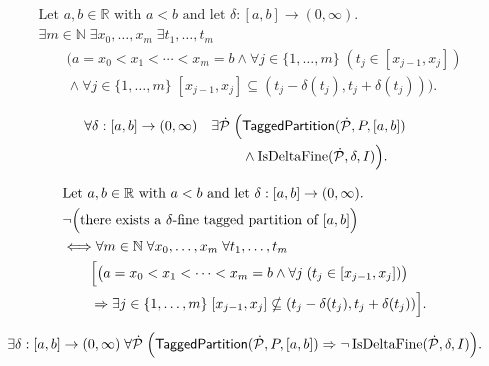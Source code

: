 \begin{remark*}
\[
\begin{aligned}
&\text{Let } a,b \in \mathbb{R} \text{ with } a < b \text{ and let } \delta:[a,b]\to(0,\infty).\\
&\exists m \in \mathbb{N}\;\exists x_0,\ldots,x_m\;\exists t_1,\ldots,t_m\\
&\qquad\bigl(a=x_0<x_1<\cdots<x_m=b
\land \forall j\in\{1,\ldots,m\}\;(t_j\in[x_{j-1},x_j])\\
&\qquad\land
\forall j\in\{1,\ldots,m\}\;[x_{j-1},x_j]\subseteq
(t_j-\delta(t_j),t_j+\delta(t_j))\bigr).
\end{aligned}
\]
\end{remark*}

\begin{remark*}
\[
\begin{aligned}
\forall \delta:[a,b]\to(0,\infty)\quad
\exists \dot{\mathcal{P}}\;\Bigl(
&\mathsf{TaggedPartition}(\dot{\mathcal{P}},P,[a,b])\\
&\land
\operatorname{IsDeltaFine}(\dot{\mathcal{P}},\delta,I)
\Bigr).
\end{aligned}
\]
\end{remark*}

\begin{remark*}
\[
\begin{aligned}
&\text{Let } a,b \in \mathbb{R} \text{ with } a < b \text{ and let } \delta:[a,b]\to(0,\infty).\\
&\neg\Bigl(\text{there exists a }\delta\text{-fine tagged partition of }[a,b]\Bigr)\\
&\Longleftrightarrow
\forall m \in \mathbb{N}\;\forall x_0,\ldots,x_m\;\forall t_1,\ldots,t_m\\
&\qquad\Bigl[
\bigl(a=x_0<x_1<\cdots<x_m=b
\land \forall j\;(t_j\in[x_{j-1},x_j])\bigr)\\
&\qquad\Rightarrow
\exists j\in\{1,\ldots,m\}\;
[x_{j-1},x_j]\nsubseteq(t_j-\delta(t_j),t_j+\delta(t_j))
\Bigr].
\end{aligned}
\]
\end{remark*}

\begin{remark*}
\[
\exists \delta:[a,b]\to(0,\infty)\;
\forall \dot{\mathcal{P}}\;\Bigl(
\mathsf{TaggedPartition}(\dot{\mathcal{P}},P,[a,b])
\Rightarrow
\neg\operatorname{IsDeltaFine}(\dot{\mathcal{P}},\delta,I)
\Bigr).
\]
\end{remark*}

